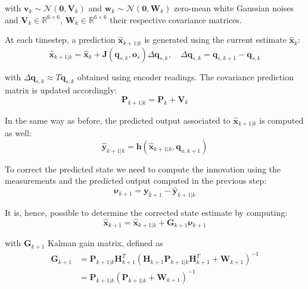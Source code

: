 \documentclass[a4paper]{article}
\begin{document}
\noindent with $\bm{v}_k \sim \bm{\mathcal{N}}(\bm{0}, \bm{V}_k)$ and $\bm{w}_k \sim \bm{\mathcal{N}}(\bm{0}, \bm{W}_k)$ zero-mean
white Gaussian noises and
$\bm{V}_k \in \mathbb{R}^{6 \times 6}$,
$\bm{W}_k \in \mathbb{R}^{6 \times 6}$ their respective
covariance matrices.


At each timestep, a prediction $\bm{\hat{x}}_{k+1|k}$ is
generated using the current estimate $\bm{\hat{x}}_{k}$:
\begin{equation}
    \bm{\hat{x}}_{k+1|k} = \bm{\hat{x}}_k + \bm{J}(\bm{q}_{s,k}, \bm{o}_s) \Delta \bm{q}_{s,k},
    \quad \Delta \bm{q}_{s,k} = \bm{q}_{s,k+1} - \bm{q}_{s,k}
\end{equation}

\noindent with $\Delta \bm{q}_{s,k} \approx T \bm{\dot{q}}_{s,k}$
obtained using encoder readings. The covariance prediction
matrix is updated accordingly:
\begin{equation}
    \bm{P}_{k+1|k} = \bm{P}_{k} + \bm{V}_{k}
\end{equation}

In the same way as before, the predicted output
associated to $\bm{\hat{x}}_{k+1|k}$ is computed as well:
\begin{equation}
    \bm{\hat{y}}_{k+1|k} = \bm{h}(\bm{\hat{x}}_{k+1|k}, \bm{q}_{n, k+1})
\end{equation}

To correct the predicted state we need to compute the
innovation using the measurements and the predicted
output computed in the previous step:
\begin{equation}
    \bm{\nu}_{k+1} = \bm{y}_{k+1} - \bm{\hat{y}}_{k+1|k}
\end{equation}

It is, hence, possible to determine the corrected state
estimate by computing:
\begin{equation}
    \bm{\hat{x}}_{k+1} = \bm{\hat{x}}_{k+1|k} + \bm{G}_{k+1} \bm{\nu}_{k+1}
\end{equation}

\noindent with $\bm{G}_{k+1}$ Kalman gain matrix, defined as
\begin{align}
    \bm{G}_{k+1} &= \bm{P}_{k+1|k} \bm{H}_{k+1}^T \left( \bm{H}_{k+1} \bm{P}_{k+1|k} \bm{H}_{k+1}^T + \bm{W}_{k+1} \right)^{-1} \\
        &= \bm{P}_{k+1|k} (\bm{P}_{k+1|k} + \bm{W}_{k+1})^{-1}
\end{align}
\end{document}
